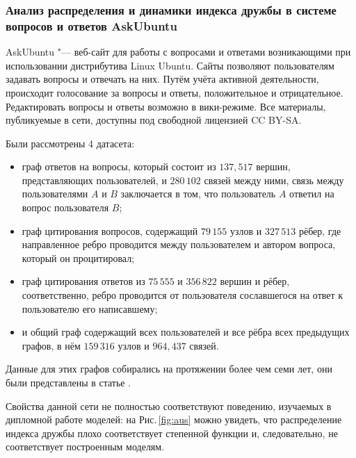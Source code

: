 \documentclass[bachelor, och, diploma]{SCWorks}
\begin{document}
\subsubsection{Анализ распределения и динамики индекса дружбы в системе вопросов и ответов AskUbuntu}
AskUbuntu "--- веб-сайт для работы с вопросами и ответами возникающими при использовании дистрибутива Linux Ubuntu. Сайты позволяют пользователям задавать вопросы и отвечать на них. Путём учёта активной деятельности, происходит голосование за вопросы и ответы, положительное и отрицательное. Редактировать вопросы и ответы возможно в вики-режиме. Все материалы, публикуемые в сети, доступны под свободной лицензией CC BY-SA. 

Были рассмотрены 4 датасета: 
\begin{itemize}
\item граф ответов на вопросы, который состоит из $137,517$ вершин, представляющих пользователей, и $280\,102$ связей между ними, связь между пользователями $A$ и $B$ заключается в том, что пользователь $A$ ответил на вопрос пользователя $B$;
\item граф цитирования вопросов, содержащий $79\,155$ узлов и $327\,513$ рёбер, где направленное ребро проводится между пользователем и автором вопроса, который он процитировал;
\item граф цитирования ответов из $75\,555$ и $356\,822$ вершин и рёбер, соответственно, ребро проводится от пользователя сославшегося на ответ к пользователю его написавшему;
\item и общий граф содержащий всех пользователей и все рёбра всех предыдущих графов, в нём $159\,316$ узлов и $964,437$ связей.
\end{itemize}
Данные для этих графов собирались на протяжении более чем семи лет, они были представлены в статье \cite{au}.

Свойства данной сети не полностью соответствуют поведению, изучаемых в дипломной работе моделей: на Рис.\,\ref{fig:aus} можно увидеть, что распределение индекса дружбы плохо соответствует степенной функции и, следовательно, не соответствует построенным моделям.
\end{document}
